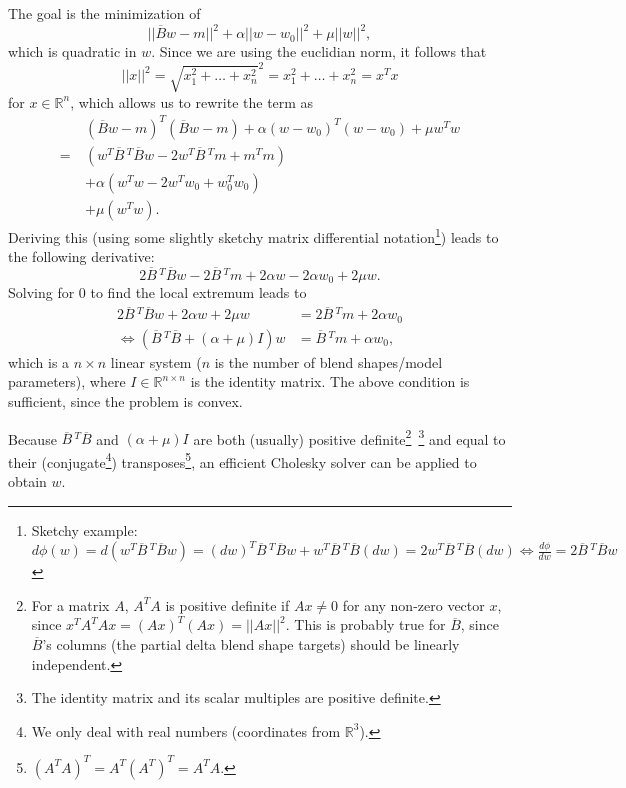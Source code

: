 The goal is the minimization of
\[||\overline{B}w-m||^2+\alpha||w-w_0||^2+\mu||w||^2,\]
which is quadratic in \(w\).
Since we are using the euclidian norm,
it follows that
\[||x||^2=\sqrt{x_1^2+\dots+x_n^2}^2=x_1^2+\dots+x_n^2=x^T x\]
for \(x\in\mathbb{R}^n\), which allows us to rewrite the term as
\begin{align*}
  &(\overline{B}w-m)^T(\overline{B}w-m)+\alpha(w-w_0)^T(w-w_0)+\mu w^T w\\
  =\ &(w^T \overline{B}\,^T \overline{B}w-2w^T \overline{B}\,^T m+m^T m)\\
  &+\alpha(w^T w-2w^T w_0+w_0^T w_0)\\
  &+\mu(w^T w).
\end{align*}
Deriving this (using some slightly sketchy matrix differential notation\footnote{
  Sketchy example:\\
  \(d\phi(w)=d(w^T\overline{B}\,^T\overline{B}w)=(dw)^T\overline{B}\,^T\overline{B}w+w^T\overline{B}\,^T\overline{B}(dw)=2w^T\overline{B}\,^T\overline{B}(dw)\Leftrightarrow\frac{d\phi}{dw}=2\overline{B}\,^T\overline{B}w\)
}) leads to the following derivative:
\[2\overline{B}\,^T\overline{B}w-2\overline{B}\,^T m+2\alpha w-2\alpha w_0+2\mu w.\]
Solving for \(0\) to find the local extremum leads to
\begin{align*}
  2\overline{B}\,^T\overline{B}w+2\alpha w+2\mu w&=2\overline{B}\,^T m+2\alpha w_0\\
  \Leftrightarrow\left(\overline{B}\,^T\overline{B}+(\alpha+\mu)I\right)w&=\overline{B}\,^T m+\alpha w_0,
\end{align*}
which is a \(n\times n\) linear system (\(n\) is the number of blend shapes/model parameters),
where \(I\in\mathbb{R}^{n\times n}\) is the identity matrix.
The above condition is sufficient, since the problem is convex.

Because \(\overline{B}\,^T\overline{B}\) and \((\alpha+\mu)I\) are both (usually) positive definite\footnote{
  For a matrix \(A\), \(A^T A\) is positive definite if \(Ax\neq 0\) for any non-zero vector \(x\),
  since \(x^T A^T Ax=(Ax)^T(Ax)=||Ax||^2\).
  This is probably true for \(\overline{B}\),
  since \(\overline{B}\)'s columns (the partial delta blend shape targets) should be linearly independent.
}\ \footnote{
  The identity matrix and its scalar multiples are positive definite.
} and equal to their (conjugate\footnote{
  We only deal with real numbers (coordinates from \(\mathbb{R}^3\)).
}) transposes\footnote{
  \((A^T A)^T=A^T(A^T)^T=A^T A\).
}, an efficient Cholesky solver can be applied to obtain \(w\).~\autocite{computeranimation}

